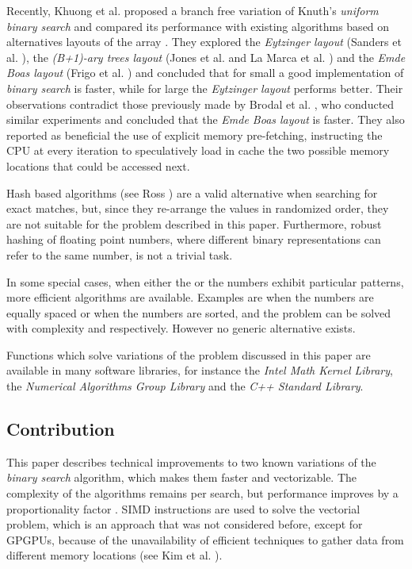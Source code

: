 \documentclass[preprint,1p,times]{elsarticle}
\begin{document}
Recently, Khuong et al. \cite{Morin2015} proposed a branch free variation of Knuth's \textit{uniform binary search} and compared its performance with existing algorithms based on alternatives layouts of the array . They explored the \textit{Eytzinger layout} (Sanders et al. \cite{Sanders2004}), the \textit{(B+1)-ary trees layout} (Jones et al. \cite{Jones1986} and La Marca et al. \cite{LaMarca1996}) and the \textit{Emde Boas layout} (Frigo et al. \cite{Prokop1999}) and concluded that for small  a good implementation of \textit{binary search} is faster, while for large  the \textit{Eytzinger layout} performs better. Their observations contradict those previously made by Brodal et al. \cite{Brodal2002}, who conducted similar experiments and concluded that the \textit{Emde Boas layout} is faster. They also reported as beneficial the use of explicit memory pre-fetching, instructing the CPU at every iteration to speculatively load in cache the two possible memory locations that could be accessed next.

Hash based algorithms (see Ross \cite{Ross2007}) are a valid alternative when searching for exact matches, but, since they re-arrange the  values in randomized order, they are not suitable for the problem described in this paper. Furthermore, robust hashing of floating point numbers, where different binary representations can refer to the same number, is not a trivial task.

In some special cases, when either the  or the  numbers exhibit particular patterns, more efficient algorithms are available. 
Examples are when the numbers  are equally spaced or when the numbers  are sorted, 
and the problem can be solved with complexity  and  respectively. However no generic alternative exists.

Functions which solve variations of the problem discussed in this paper are available in many software libraries, for instance the \textit{Intel Math Kernel Library}, the \textit{Numerical Algorithms Group Library} and the \textit{C++ Standard Library}.



\subsection{Contribution}
This paper describes technical improvements to two known variations of the \textit{binary search} algorithm, which makes them faster and vectorizable. The complexity of the algorithms remains  per search, but performance improves by a proportionality factor . SIMD instructions are used to solve the vectorial problem, which is an approach that was not considered before, except for GPGPUs, because of the unavailability of efficient techniques to gather data from different memory locations (see Kim et al. \cite{Kim2011}).
\end{document}
